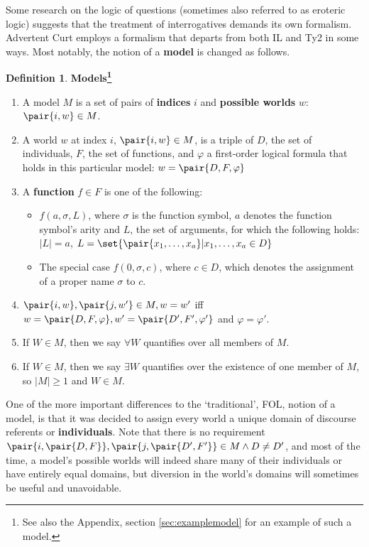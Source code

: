\documentclass[a4paper]{article}
\newcommand{\abbr}{\textsf} %
\newcommand{\stress}{\textbf} %
\newcommand{\term}[1]{\textsf{\textbf{#1}}} %
\newcommand{\pn}{\textsf} %
\newcommand{\acurt}{\pn{Advertent Curt}}
\theoremstyle{remark}
\theoremstyle{remark}
\theoremstyle{definition}
\newtheorem{definition}[thm]{Definition}
\theoremstyle{definition}
\begin{document}
Some research on the logic of questions (sometimes also referred to as eroteric
logic) suggests that the treatment of interrogatives demands its own formalism.
\acurt{} employs a formalism that departs from both \abbr{IL} and \abbr{Ty2} in
some ways. Most notably, the notion of a \term{model} is changed as follows.

\begin{definition}\label{Models}
  \stress{Models\footnote{See also the Appendix, section \ref{sec:examplemodel}
  for an example of such a model.}}
  \begin{enumerate}
    \item A model $M$ is a set of pairs of \term{indices} $i$ and \term{possible
    worlds} $w$: $\pair{i,w} \in M$. 
    \item A world $w$ at index $i$, $\pair{i,w} \in M$, is a triple of $D$, the set
    of individuals, $F$, the set of functions, and $\varphi$ a first-order
    logical formula that holds in this particular model: $w = \pair{D,F,\varphi}$
    \item A \term{function} $f \in F$ is one of the following: 
    \begin{itemize}
      \item $f(a,\sigma,L)$, where $\sigma$ is the function symbol, $a$ denotes
      the function symbol's arity and $L$, the set of arguments, for which the
      following holds: $|L| = a$,
      $L = \set{\pair{x_1,\ldots{},x_a}|x_1,\ldots{},x_a \in D}$
      \item The special case $f(0,\sigma,c)$, where $c \in D$, which denotes the
      assignment of a proper name $\sigma$ to $c$.
    \end{itemize}
    \item $\pair{i,w}, \pair{j,w'} \in M, w = w'$ iff $w = \pair{D,F,\varphi}, w' =
    \pair{D',F',\varphi'}$ and $\varphi = \varphi'$.
    \item If $W \in M$, then we say $\forall W$ quantifies over all members of $M$.
    \item If $W \in M$, then we say $\exists W$ quantifies over the existence of
    one member of $M$, so $|M| \geq 1$ and $W \in M$.
  \end{enumerate}
\end{definition}

One of the more important differences to the `traditional', \abbr{FOL}, notion of a model, is
that it was decided to assign every world a unique domain of discourse referents
or \term{individuals}. Note that there is no requirement $\pair{i,\pair{D,F}},
\pair{j,\pair{D',F'}} \in M \wedge D\neq D'$, and most of the time, a model's
possible worlds will indeed share many of their individuals or have entirely
equal domains, but diversion in the world's domains will sometimes be useful and
unavoidable.
\end{document}
